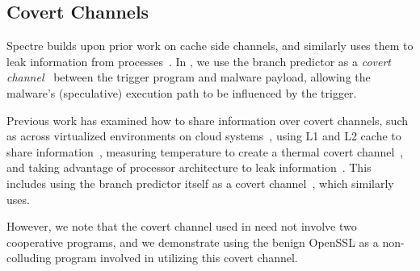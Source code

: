 \subsection{Covert Channels}

Spectre builds upon prior work on cache side channels, and similarly uses them
to leak information from
processes~\cite{percival2005cache,zhang2012cross,osvik2006cache}. In \speculake,
we use the branch predictor as a \emph{covert channel}~\cite{lampson1973note}
between the trigger program and malware payload, allowing the malware's
(speculative) execution path to be influenced by the trigger.

Previous work has examined how to share information over covert channels, such
as across virtualized environments on cloud systems~\cite{wu2012whispers}, using
L1 and L2 cache to share information~\cite{percival2005cache}, measuring
temperature to create a thermal covert channel~\cite{masti2015thermal,
bartolini2016capacity}, and taking advantage of processor architecture to leak
information~\cite{wang2006covert}. This includes using the branch predictor
itself as a covert
channel~\cite{evtyushkin2016understanding,evtyushkin2015covert}, which
\speculake similarly uses.

However, we note that the covert channel used in \speculake need not involve two
cooperative programs, and we demonstrate using the benign OpenSSL as a
non-colluding program involved in utilizing this covert channel.




